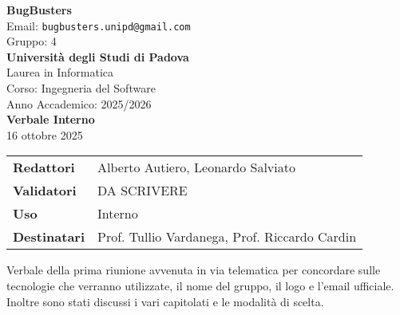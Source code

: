\documentclass[a4paper,12pt]{article}
\begin{document}
\begin{center}  
  
  {\Large\bfseries\color{primaryblue} BugBusters}\\[0.3cm]
  {\small\color{darkgray} Email: \texttt{bugbusters.unipd@gmail.com}} \\[0.1cm]
  {\small\color{darkgray} Gruppo: 4} \\[0.5cm]

  {\large\bfseries Università degli Studi di Padova}\\[0.3cm]
  {\small Laurea in Informatica}\\[0.2cm]
  {\small Corso: Ingegneria del Software}\\[0.2cm]
  {\small Anno Accademico: 2025/2026}\\[0.8cm]

  {\Huge\bfseries\color{primaryblue} Verbale Interno}\\[0.3cm]
  {\Large\color{secondaryblue} 16 ottobre 2025}\\[0.8cm]
\end{center}

\begin{center}
\begin{tcolorbox}[colback=lightgray,colframe=primaryblue,width=0.85\textwidth,arc=3mm,boxrule=0.5pt]
\begin{tabular}{@{}ll@{}}
\textbf{Redattori}    & Alberto Autiero, Leonardo Salviato \\
\textbf{Validatori}    & DA SCRIVERE \\
\textbf{Uso}          & Interno \\
\textbf{Destinatari}  & Prof. Tullio Vardanega, Prof. Riccardo Cardin \\
\end{tabular}
\end{tcolorbox}
\end{center}

\vspace{0.5cm}

\begin{center}
\begin{tcolorbox}[colback=secondaryblue!10,colframe=secondaryblue,width=0.9\textwidth,arc=3mm,boxrule=0.8pt,title={\bfseries Abstract}]
Verbale della prima riunione avvenuta in via telematica per concordare sulle tecnologie che verranno utilizzate, il nome del gruppo, il logo e l'email ufficiale. Inoltre sono stati discussi i vari capitolati e le modalità di scelta.
\end{tcolorbox}
\end{center}
\end{document}
